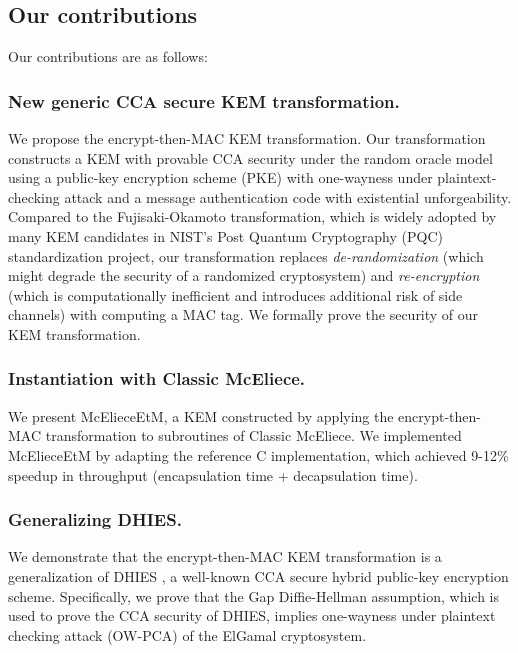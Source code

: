\documentclass[runningheads]{llncs}
\begin{document}
\subsection{Our contributions}\label{sec:our-contributions}
Our contributions are as follows:

\subsubsection{New generic CCA secure KEM transformation.} We propose the encrypt-then-MAC KEM transformation. Our transformation constructs a KEM with provable CCA security under the random oracle model using a public-key encryption scheme (PKE) with one-wayness under plaintext-checking attack and a message authentication code with existential unforgeability. Compared to the Fujisaki-Okamoto transformation, which is widely adopted by many KEM candidates in NIST's Post Quantum Cryptography (PQC) standardization project, our transformation replaces \textit{de-randomization} (which might degrade the security of a randomized cryptosystem) and \textit{re-encryption} (which is computationally inefficient and introduces additional risk of side channels) with computing a MAC tag. We formally prove the security of our KEM transformation.

\subsubsection{Instantiation with Classic McEliece.} We present McElieceEtM, a KEM constructed by applying the encrypt-then-MAC transformation to subroutines of Classic McEliece. We implemented McElieceEtM by adapting the reference C implementation, which achieved 9-12\% speedup in throughput (encapsulation time + decapsulation time).

\subsubsection{Generalizing DHIES.} We demonstrate that the encrypt-then-MAC KEM transformation is a generalization of DHIES \cite{DBLP:conf/ctrsa/AbdallaBR01,DBLP:journals/iacr/AbdallaBR99}, a well-known CCA secure hybrid public-key encryption scheme. Specifically, we prove that the Gap Diffie-Hellman assumption, which is used to prove the CCA security of DHIES, implies one-wayness under plaintext checking attack (OW-PCA) of the ElGamal cryptosystem.

\end{document}
